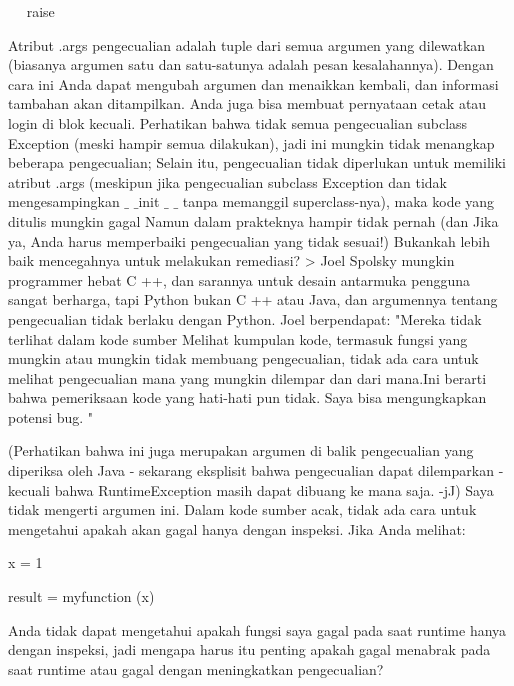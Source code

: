 ~~ raise \par
\vspace{20pt}
\noindent 
 \hspace*{0.64in} Atribut .args pengecualian adalah tuple dari semua argumen yang dilewatkan (biasanya argumen satu dan satu-satunya adalah pesan kesalahannya). Dengan cara ini Anda dapat mengubah argumen dan menaikkan kembali, dan informasi tambahan akan ditampilkan. Anda juga bisa membuat pernyataan cetak atau login di blok kecuali. Perhatikan bahwa tidak semua pengecualian subclass Exception (meski hampir semua dilakukan), jadi ini mungkin tidak menangkap beberapa pengecualian; Selain itu, pengecualian tidak diperlukan untuk memiliki atribut .args (meskipun jika pengecualian subclass Exception dan tidak mengesampingkan  $  \_  $ $  \_  $init $  \_  $ $  \_  $ tanpa memanggil superclass-nya), maka kode yang ditulis mungkin gagal Namun dalam prakteknya hampir tidak pernah (dan Jika ya, Anda harus memperbaiki pengecualian yang tidak sesuai!) Bukankah lebih baik mencegahnya untuk melakukan remediasi? >  
 Joel Spolsky mungkin programmer hebat C ++, dan sarannya untuk desain antarmuka pengguna sangat berharga, tapi Python bukan C ++ atau Java, dan argumennya tentang pengecualian tidak berlaku dengan Python. Joel berpendapat: "Mereka tidak terlihat dalam kode sumber Melihat kumpulan kode, termasuk fungsi yang mungkin atau mungkin tidak membuang pengecualian, tidak ada cara untuk melihat pengecualian mana yang mungkin dilempar dan dari mana.Ini berarti bahwa pemeriksaan kode yang hati-hati pun tidak. Saya bisa mengungkapkan potensi bug. " \par
\noindent 
 \hspace*{0.64in} (Perhatikan bahwa ini juga merupakan argumen di balik pengecualian yang diperiksa oleh Java - sekarang eksplisit bahwa pengecualian dapat dilemparkan - kecuali bahwa RuntimeException masih dapat dibuang ke mana saja. -jJ) Saya tidak mengerti argumen ini. Dalam kode sumber acak, tidak ada cara untuk mengetahui apakah akan gagal hanya dengan inspeksi. Jika Anda melihat: \par
\noindent 
\vspace{12pt}
\noindent 
\vspace{12pt}
\noindent 
x = 1 \par
\noindent 
result = myfunction (x) \par
\vspace{20pt}
\noindent 
 \hspace*{0.64in} Anda tidak dapat mengetahui apakah fungsi saya gagal pada saat runtime hanya dengan inspeksi, jadi mengapa harus itu penting apakah gagal menabrak pada saat runtime atau gagal dengan meningkatkan pengecualian? \par
